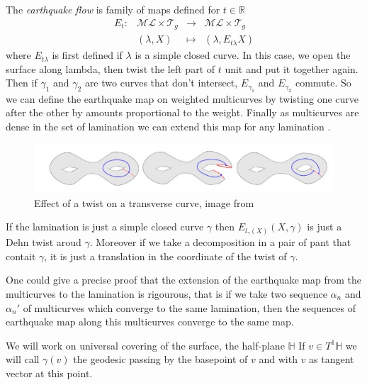 \begin{dfnt}
The \emph{earthquake flow} is family of maps defined for $t \in \mathbb{R}$
\[
\begin{array}{crcl}

E_t: & \mathcal{ML}\times \mathcal{T}_g & \to & \mathcal{ML}\times \mathcal{T}_g \\

& (\lambda,X) & \mapsto & (\lambda,E_{t\lambda}X)

\end{array}
\]
where $E_{t \lambda}$ is first defined if $\lambda$ is a simple closed curve. In this case, we open the surface along lambda, then twist the left part of $t$ unit and put it together again. Then if $\gamma_1$ and $\gamma_2$ are two curves that don't intersect, $E_{\gamma_1}$ and $E_{\gamma_2}$ commute. So we can define the earthquake map on weighted multicurves by twisting one curve after the other by amounts proportional to the weight. Finally as multicurves are dense in the set of lamination we can extend this map for any lamination \cite{NielsenRealizationPro}.
\end{dfnt}

\begin{figure}[h!]
\centering
\includegraphics[width=12cm]{Image/Earthquake.jpg}
\caption{Effect of a twist on a transverse curve, image from \cite{wright2020tour}}
\end{figure}

\begin{rmq}
If the lamination is just a simple closed curve $\gamma$ then $E_{l_{\gamma}(X)}(X,\gamma)$ is just a Dehn twist aroud $\gamma$.
Moreover if we take a decomposition in a pair of pant that contait $\gamma$, it is just a translation in the coordinate of the twist of $\gamma$.
\end{rmq}

One could give a precise proof that the extension of the earthquake map from the multicurves to the lamination is rigourous, that is if we take two sequence $\alpha_n$ and $\alpha_n'$ of multicurves which converge to the same lamination, then the sequences of earthquake map along this multicurves converge to the same map.

We will work on universal covering of the surface, the half-plane $\mathbb{H}$
If $v \in T^1 \mathbb{H}$ we will call $\gamma(v)$ the geodesic passing by the basepoint of $v$ and with $v$ as tangent vector at this point.

